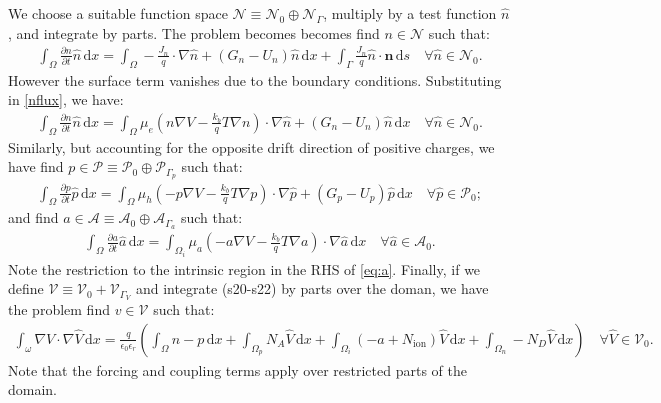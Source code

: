 \documentclass[a4paper,11pt]{article}
\renewcommand{\vec}[1]{\mathbf{#1}}
\begin{document}
We choose a suitable function space $\mathcal{N}\equiv \mathcal{N}_0 \oplus \mathcal{N}_{\Gamma}$, multiply by a test function $\hat{n}$, and
integrate by parts. The problem becomes becomes find $n\in \mathcal{N}$ such that:
\begin{align}
  \int_\Omega \frac{\partial n}{\partial t}\hat{n} \,\mathrm{d}x = 
    \int_\Omega -\frac{J_n}{q} \cdot \nabla\hat{n} + (G_n - U_n)\hat{n} \,\mathrm{d}x
   + \int_\Gamma \frac{J_n}{q}  \hat{n} \cdot \vec{n} \,\mathrm{d}s \quad
  \forall \hat{n} \in \mathcal{N}_0.
\end{align}
However the surface term vanishes due to the boundary
conditions. Substituting in \eqref{nflux}, we have:
\begin{align}
  \int_\Omega \frac{\partial n}{\partial t}\hat{n} \,\mathrm{d}x = 
  \int_\Omega \mu_e\left(n \nabla V  
  - \frac{k_b}{q} T  \nabla n \right)\cdot \nabla \hat{n} 
  + \left(G_n - U_n\right)\hat{n} \,\mathrm{d}x \quad
  \forall \hat{n} \in \mathcal{N}_0.\label{eq:n}
\end{align}
Similarly, but accounting for the opposite drift direction of positive
charges, we have find
$p\in \mathcal{P}\equiv\mathcal{P}_0 \oplus\mathcal{P}_{\Gamma_p}$ such
that:
\begin{align}
  \int_\Omega \frac{\partial p}{\partial t} \hat{p}\,\mathrm{d}x = 
  \int_\Omega \mu_h  \left(-p \nabla V  
  - \frac{k_b}{q} T  \nabla p\right) \cdot \nabla \hat{p} 
  + \left(G_p - U_p\right)\hat{p} \,\mathrm{d}x \quad
  \forall \hat{p} \in \mathcal{P}_0;\label{eq:p}
\end{align}
and find $a\in \mathcal{A}\equiv\mathcal{A}_0 \oplus\mathcal{A}_{\Gamma_a}$ such that:
\begin{align}
  \int_\Omega \frac{\partial a}{\partial t} \hat{a}\,\mathrm{d}x = 
  \int_{\Omega_i} \mu_a  \left(-a \nabla V 
  - \frac{k_b}{q} T  \nabla a\right) \cdot \nabla \hat{a} 
  \,\mathrm{d}x \quad
  \forall \hat{a} \in \mathcal{A}_0. \label{eq:a}
\end{align}
Note the restriction to the intrinsic region in the RHS of
\eqref{eq:a}. Finally, if we define $\mathcal{V} \equiv \mathcal{V}_0 +
\mathcal{V}_{\Gamma_V}$ and integrate (s20-s22) by parts over the doman, we
have the problem find $v\in \mathcal{V}$ such that:
\begin{align}
  \int_\omega \nabla V \cdot \nabla\hat{V} \,\mathrm{d}x =
  \frac{q}{\epsilon_0\epsilon_r}\left(\int_{\Omega} n - p \,\mathrm{d}x +
  \int_{\Omega_p} N_A \hat{V} \,\mathrm{d}x + 
  \int_{\Omega_i} (-a + N_{\mathrm{ion}}) \hat{V} \,\mathrm{d}x + 
  \int_{\Omega_n} - N_D \hat{V} \,\mathrm{d}x \right) \quad\forall \hat{V}\in\mathcal{V}_0.
\end{align}
Note that the forcing and coupling terms apply over restricted parts
of the domain.
 
\end{document}
